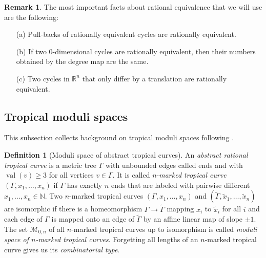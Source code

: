 \documentclass[11pt,reqno,a4]{amsart}
\theoremstyle{dotless}
\theoremstyle{definition}
\newtheorem{definition}[corollary]{Definition}
\newtheorem{remark}[corollary]{Remark}
\newcommand{\val}{\operatorname{val}}
\begin{document}
\begin{remark}\label{remark:facts_about_rational_equivalence}
The most important facts about rational equivalence that we will use are the following:
\begin{itemize}
\item[(a)]
Pull-backs of rationally equivalent cycles are rationally equivalent.
\item[(b)]
If two $0$-dimensional cycles are rationally equivalent, then their numbers obtained by the degree map are the same.
\item[(c)]
Two cycles in $\mathbb{R}^n$ that only differ by a translation are rationally equivalent.
\end{itemize}
\end{remark}



\subsection*{Tropical moduli spaces}

This subsection collects background on tropical moduli spaces following \cite{GathmannKerberMarkwig}.

\begin{definition}[Moduli space of abstract tropical curves]
An \textit{abstract rational tropical curve} is a metric tree $\Gamma$ with unbounded edges called ends and with $\val(v)\geq 3$ for all vertices $v\in\Gamma$. It is called $n$-\textit{marked tropical curve} $(\Gamma,x_1,\dots,x_n)$ if $\Gamma$ has exactly $n$ ends that are labeled with pairwise different $x_1,\dots,x_n\in\mathbb{N}$. Two $n$-marked tropical curves $(\Gamma,x_1,\dots,x_n)$ and $(\tilde{\Gamma},\tilde{x}_1,\dots,\tilde{x}_n)$ are isomorphic if there is a homeomorphism $\Gamma\to \tilde{\Gamma}$ mapping $x_i$ to $\tilde{x}_i$ for all $i$ and each edge of $\Gamma$ is mapped onto an edge of $\tilde{\Gamma}$ by an affine linear map of slope $\pm 1$. The set $\mathcal{M}_{0,n}$ of all $n$-marked tropical curves up to isomorphism is called \textit{moduli space of $n$-marked tropical curves}. Forgetting all lengths of an $n$-marked tropical curve gives us its \textit{combinatorial type}.
\end{definition}
\end{document}
